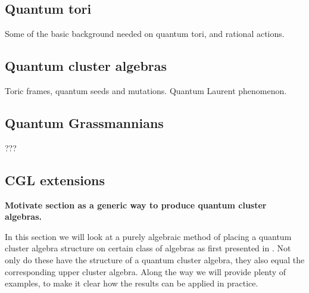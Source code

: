 \documentclass{article}
\begin{document}
\subsection{Quantum tori}

Some of the basic background needed on quantum tori, and rational actions.

\subsection{Quantum cluster algebras}

Toric frames, quantum seeds and mutations. Quantum Laurent phenomenon.

\subsection{Quantum Grassmannians}
???

\subsection{CGL extensions}

\textbf{Motivate section as a generic way to produce quantum cluster algebras.}

In this section we will look at a purely algebraic method of placing a quantum cluster
algebra structure on certain class of algebras as first presented in
\cite{GoodearlYakimov2017QCA}. Not only do these have the structure of a quantum
cluster algebra, they also equal the corresponding upper cluster algebra. Along the way
we will provide plenty of examples, to make it clear how the results can be applied in
practice.
\end{document}
